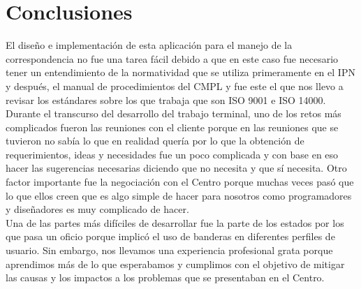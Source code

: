 \section{Conclusiones}

El diseño e implementación de esta aplicación para el manejo de la correspondencia no fue una tarea fácil debido a que en este caso fue necesario tener un entendimiento de la normatividad que se utiliza primeramente en el IPN y después, el manual de procedimientos del CMPL y fue este el que nos llevo a revisar los estándares sobre los que trabaja que son ISO 9001 e ISO 14000. \\

Durante el transcurso del desarrollo del trabajo terminal, uno de los retos más complicados fueron las reuniones con el cliente porque en las reuniones que se tuvieron no sabía lo que en realidad quería por lo que la obtención de requerimientos, ideas y necesidades fue un poco complicada y con base en eso hacer las sugerencias necesarias diciendo que no necesita y que sí necesita. Otro factor importante fue la negociación con el Centro porque muchas veces pasó que lo que ellos creen que es algo simple de hacer para nosotros como programadores y diseñadores es muy complicado de hacer.\\

Una de las partes más difíciles de desarrollar fue la parte de los estados por los que pasa un oficio porque implicó el uso de banderas en diferentes perfiles de usuario. Sin embargo, nos llevamos una experiencia profesional grata porque aprendimos más de lo que esperabamos y cumplimos con el objetivo de mitigar las causas y los impactos a los problemas que se presentaban en el Centro.